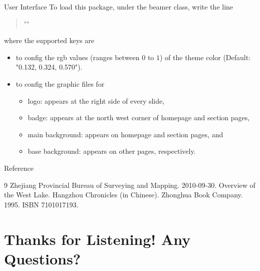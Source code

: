 \documentclass[handout, svgnames, aspectratio = 1610]{beamer}
\providecommand \pkg {\textsf}
\DeclareRobustCommand \meta[1]
  {\itshape \ensuremath \langle #1\/\ensuremath \rangle \upshape}
\begin{document}
\begin{frame}[t, fragile]{User Interface}
  To load this package, under the \pkg{beamer} class, write the line\par
  \begin{quote}
    "\usetheme["\meta{keys}"]{Westlake}"
  \end{quote}\par
  where the supported keys are
  \begin{itemize}
    \item {} to config the rgb values
    (ranges between $0$ to $1$) of the theme color
    (Default: "0.132, 0.324, 0.570").
    \item {} to config the graphic
    files for
    \begin{itemize}
      \item logo: appears at the right side of every slide,
      \item badge: appears at the north west corner of homepage
      and section pages,
      \item main background: appears on homepage and section pages, and
      \item base background: appears on other pages, respectively.
    \end{itemize}
  \end{itemize}
  { Reference}
  \begin{thebibliography}{9}
    Zhejiang Provincial Bureau of Surveying and Mapping. 2010-09-30.
    Overview of the West Lake. Hangzhou Chronicles (in Chinese).
    \newblock
    Zhonghua Book Company. 1995. ISBN 7101017193.
  \end{thebibliography}
\end{frame}

\section{Thanks for Listening! Any Questions?}
\end{document}
